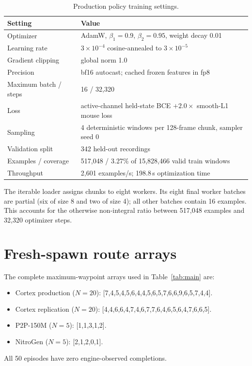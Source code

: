 \documentclass[11pt]{article}
\newcommand{\x}{\ensuremath{\times}}
\begin{document}
\begin{table}[ht]
\centering
\small
\begin{tabular}{ll}
\toprule
Setting & Value \\
\midrule
Optimizer & AdamW, $\beta_1{=}0.9$, $\beta_2{=}0.95$, weight decay 0.01 \\
Learning rate & $3\times10^{-4}$ cosine-annealed to $3\times10^{-5}$ \\
Gradient clipping & global norm 1.0 \\
Precision & bf16 autocast; cached frozen features in fp8 \\
Maximum batch / steps & 16 / 32{,}320 \\
Loss & active-channel held-state BCE $+ 2.0\x{}$ smooth-L1 mouse loss \\
Sampling & 4 deterministic windows per 128-frame chunk, sampler seed 0 \\
Validation split & 342 held-out recordings \\
Examples / coverage & 517{,}048 / 3.27\% of 15{,}828{,}466 valid train windows \\
Throughput & 2{,}601 examples/s; 198.8\,s optimization time \\
\bottomrule
\end{tabular}
\caption{Production policy training settings.}
\label{tab:training}
\end{table}

The iterable loader assigns chunks to eight workers. Its eight final worker batches are partial (six of size 8 and two of size 4); all other batches contain 16 examples. This accounts for the otherwise non-integral ratio between 517{,}048 examples and 32{,}320 optimizer steps.

\section{Fresh-spawn route arrays}\label{app:episodes}

The complete maximum-waypoint arrays used in Table~\ref{tab:main} are:
\begin{itemize}
\setlength{\itemsep}{0pt}
\setlength{\parsep}{0pt}
\setlength{\parskip}{0pt}
\setlength{\topsep}{2pt}
\setlength{\partopsep}{0pt}
\item Cortex production ($N{=}20$): [7,4,5,4,5,6,4,4,5,6,5,7,6,6,9,6,5,7,4,4].
\item Cortex replication ($N{=}20$): [4,4,6,6,4,7,4,6,7,7,6,4,6,5,6,4,7,6,6,5].
\item P2P-150M ($N{=}5$): [1,1,3,1,2].
\item NitroGen ($N{=}5$): [2,1,2,0,1].
\end{itemize}
All 50 episodes have zero engine-observed completions.
\end{document}
